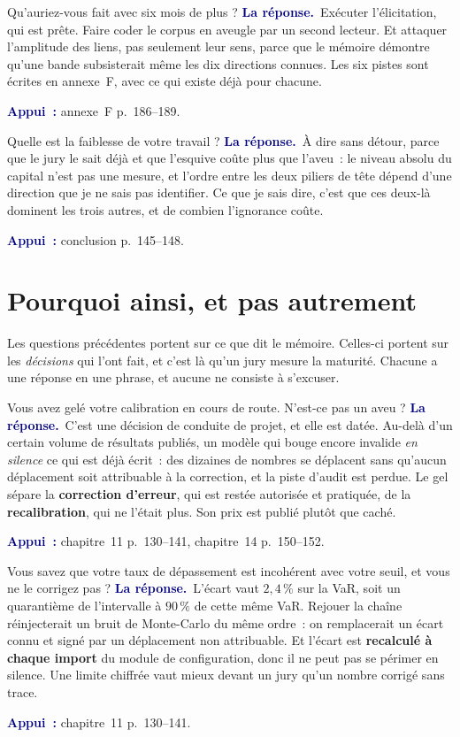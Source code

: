 \documentclass[11pt,a4paper]{article}
\newcommand{\rep}[1]{\smallskip\noindent\textcolor{navy}{\textbf{La réponse.}}\ #1\par}
\newcommand{\appui}[1]{\smallskip\noindent\small\textcolor{navy}{\textbf{Appui~:}} #1\par\normalsize}
\begin{document}
\begin{question}{\og Qu'auriez-vous fait avec six mois de plus ?\fg{}}
\rep{Exécuter l'élicitation, qui est prête. Faire coder le corpus en aveugle par un second
lecteur. Et attaquer l'amplitude des liens, pas seulement leur sens, parce que le mémoire
démontre qu'une bande subsisterait même les dix directions connues. Les six pistes sont écrites
en annexe~F, avec ce qui existe déjà pour chacune.}
\appui{annexe~F p.~186--189.}
\end{question}

\begin{question}{\og Quelle est la faiblesse de votre travail ?\fg{}}
\rep{À dire sans détour, parce que le jury le sait déjà et que l'esquive coûte plus que
l'aveu~: le niveau absolu du capital n'est pas une mesure, et l'ordre entre les deux piliers de
tête dépend d'une direction que je ne sais pas identifier. Ce que je sais dire, c'est que ces
deux-là dominent les trois autres, et de combien l'ignorance coûte.}
\appui{conclusion p.~145--148.}
\end{question}

\section{Pourquoi ainsi, et pas autrement}

\noindent Les questions précédentes portent sur ce que dit le mémoire. Celles-ci portent sur les
\emph{décisions} qui l'ont fait, et c'est là qu'un jury mesure la maturité. Chacune a une réponse
en une phrase, et aucune ne consiste à s'excuser.

\begin{question}{\og Vous avez gelé votre calibration en cours de route. N'est-ce pas un aveu ?\fg{}}
\rep{C'est une décision de conduite de projet, et elle est datée. Au-delà d'un certain volume de
résultats publiés, un modèle qui bouge encore invalide \emph{en silence} ce qui est déjà écrit~:
des dizaines de nombres se déplacent sans qu'aucun déplacement soit attribuable à la correction,
et la piste d'audit est perdue. Le gel sépare la \textbf{correction d'erreur}, qui est restée
autorisée et pratiquée, de la \textbf{recalibration}, qui ne l'était plus. Son prix est publié
plutôt que caché.}
\appui{chapitre~11 p.~130--141, chapitre~14 p.~150--152.}
\end{question}

\begin{question}{\og Vous savez que votre taux de dépassement est incohérent avec votre seuil, et vous ne le corrigez pas ?\fg{}}
\rep{L'écart vaut $2{,}4\,\%$ sur la VaR, soit un quarantième de l'intervalle à $90\,\%$ de cette
même VaR. Rejouer la chaîne réinjecterait un bruit de Monte-Carlo du même ordre~: on remplacerait
un écart connu et signé par un déplacement non attribuable. Et l'écart est \textbf{recalculé à
chaque import} du module de configuration, donc il ne peut pas se périmer en silence. Une limite
chiffrée vaut mieux devant un jury qu'un nombre corrigé sans trace.}
\appui{chapitre~11 p.~130--141.}
\end{question}
\end{document}
